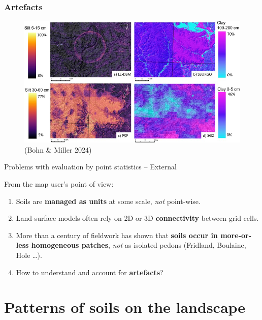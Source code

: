 \documentclass[aspectratio=169]{beamer}
\begin{document}
\begin{frame}
  \frametitle{Artefacts}
    \begin{figure}
        \centering
        \includegraphics[height=0.7\textheight]{./graphics_david/1-s2.0-S0016706124000107-gr15.jpg}
        \\(Bohn \& Miller 2024)
    \end{figure}
\end{frame}


\begin{frame}{Problems with evaluation by point statistics -- External}

From the map user's point of view:
\begin{enumerate}
\item  Soils are \textbf{managed as units} at some scale, \emph{not} point-wise.
\item  Land-surface models often rely on 2D or 3D \textbf{connectivity} between grid cells.
\item  More than a century of fieldwork has shown that \textbf{soils
    occur in more-or-less homogeneous patches}, \emph{not} as isolated
  pedons (Fridland, Boulaine, Hole \ldots).
\item How to understand and account for \textbf{artefacts}?
  \end{enumerate}
  
\end{frame}

\section{Patterns of soils on the landscape}
\end{document}
